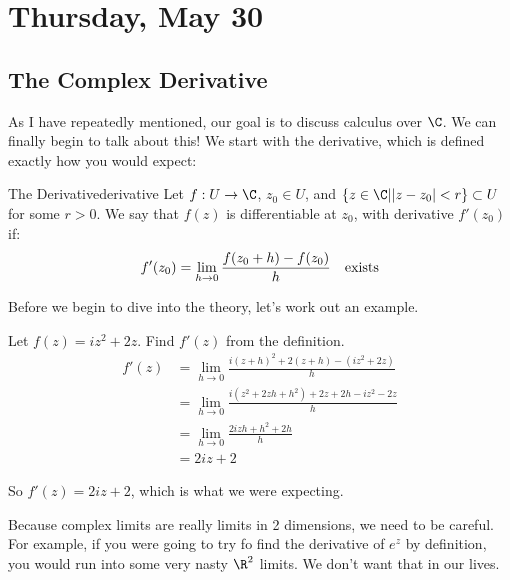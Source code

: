 \section{Thursday, May 30}


\subsection{The Complex Derivative}

As I have repeatedly mentioned, our goal is to discuss calculus over $\C$. We can finally begin to talk about this! We start with the derivative, which is defined exactly how you would expect:

\begin{defbo}{The Derivative}{derivative}
Let $f:U\rightarrow \C$, $z_0\in U$, and $\{z\in\C| |z-z_0|< r\}\subset U$ for some $r > 0$. We say that $f(z)$ is differentiable at $z_0$, with derivative $f'(z_0)$ if:
$$f'(z_0) = \lim_{h\rightarrow 0} \frac{f(z_0 + h) - f(z_0)}{h} \text{\quad exists}$$
\end{defbo}

Before we begin to dive into the theory, let's work out an example.

\begin{ex}{}{} Let $f(z) = iz^2 + 2z$. Find $f'(z)$ from the definition.
\begin{align*}f'(z) &= \lim_{h\rightarrow 0} \frac{i(z+h)^2 + 2(z+h) - (iz^2 + 2z)}{h}\\
&= \lim_{h\rightarrow 0}\frac{i(z^2 + 2zh + h^2) + 2z + 2h - iz^2 - 2z}{h}\\
&= \lim_{h\rightarrow 0} \frac{2izh + h^2 + 2h}{h}\\
&= 2iz + 2
\end{align*}

So $f'(z) = 2iz + 2$, which is what we were expecting.
\end{ex}

Because complex limits are really limits in 2 dimensions, we need to be careful. For example, if you were going to try fo find the derivative of $e^z$ by definition, you would run into some very nasty $\R^2$ limits. We don't want that in our lives. 

